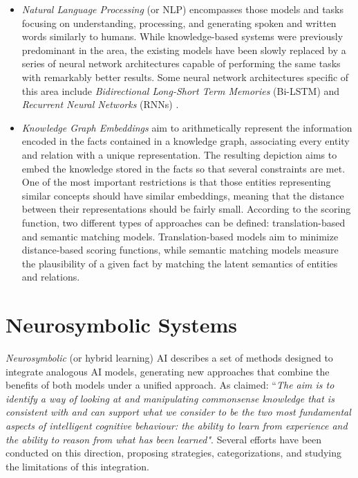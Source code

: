 \begin{itemize}
\begin{itemize}
        \item \textit{Natural Language Processing} (or NLP) \citep{chowdhury_2003_nlp} encompasses those models and tasks focusing on understanding, processing, and generating spoken and written words similarly to humans. While knowledge-based systems were previously predominant in the area, the existing models have been slowly replaced by a series of neural network architectures capable of performing the same tasks with remarkably better results. Some neural network architectures specific of this area include \textit{Bidirectional Long-Short Term Memories} (Bi-LSTM) \citep{devlin-etal-2019-bert,peters-etal-2018-deep} and \textit{Recurrent Neural Networks} (RNNs) \citep{wang-etal-2016-combination}. 
        
        \item \textit{Knowledge Graph Embeddings} \citep{dai_survey_2020} aim to arithmetically represent the information encoded in the facts contained in a knowledge graph, associating every entity and relation with a unique representation. The resulting depiction aims to embed the knowledge stored in the facts so that several constraints are met. One of the most important restrictions is that those entities representing similar concepts should have similar embeddings, meaning that the distance between their representations should be fairly small. According to the scoring function, two different types of approaches can be defined: translation-based and semantic matching models. Translation-based models aim to minimize distance-based scoring functions, while semantic matching models measure the plausibility of a given fact by matching the latent semantics of entities and relations.
    \end{itemize}

\end{itemize}


\section{Neurosymbolic Systems} \label{sec:sota_neurosymbolic_systems}
\textit{Neurosymbolic} (or hybrid learning) AI describes a set of methods designed to integrate analogous AI models, generating new approaches that combine the benefits of both models under a unified approach. As \cite{valiant_three_2003} claimed: ``\textit{The aim is to identify a way of looking at and manipulating commonsense knowledge that is consistent with and can support what we consider to be the two most fundamental aspects of intelligent cognitive behaviour: the ability to learn from experience and the ability to reason from what has been learned"}. Several efforts have been conducted on this direction, proposing strategies, categorizations, and studying the limitations of this integration. 

